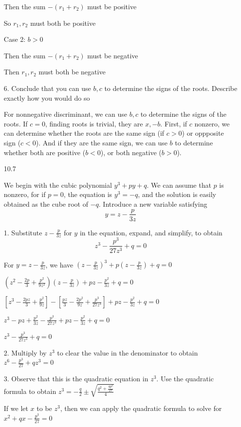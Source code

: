 \documentclass[12pt]{article}
\begin{document}
\begin{itemize}
		Then the sum $-(r_1 + r_2)$ must be positive

		So $r_1, r_2$ must both be positive

		Case 2: $b > 0$

		Then the sum $-(r_1 + r_2)$ must be negative

		Then $r_1, r_2$ must both be negative

	6. Conclude that you can use $b, c$ to determine the signs of the roots. Describe exactly how you would do so

		For nonnegative discriminant, we can use $b,c$ to determine the signs of the roots. If $c = 0$, finding roots is trivial, they are $x, -b$. First, if $c$ nonzero, we can determine whether the roots are the same sign (if $c > 0$) or oppposite sign ($c < 0$). And if they are the same sign, we can use $b$ to determine whether both are positive ($b < 0$), or both negative ($b > 0$).
		

\newpage

\item[10.7]

	We begin with the cubic polynomial $y^3 + py + q$. We can assume that $p$ is nonzero, for if $p = 0$, the equation is $y^3 = -q$, and the solution is easily obtained as the cube root of $-q$. Introduce a new variable satisfying $$y = z - \frac{p}{3z}$$

	1. Substitute $z - \frac{p}{3z}$ for $y$ in the equation, expand, and simplify, to obtain $$z^3 - \frac{p^3}{27z^3} + q = 0$$

	For $y = z - \frac{p}{3z}$, we have $(z - \frac{p}{3z})^3 + p(z-\frac{p}{3z}) + q = 0$

	$(z^2 - \frac{2p}{3} + \frac{p^2}{9z^2})(z-\frac{p}{3z}) + pz - \frac{p^2}{3z} + q = 0$

	$[z^3 - \frac{2pz}{3} + \frac{p^2}{9z}] - [\frac{pz}{3} - \frac{2p^2}{9z} + \frac{p^3}{27z^3}] + pz - \frac{p^2}{3z} + q = 0$

	$z^3 - pz + \frac{p^2}{3z} - \frac{p^3}{27z^3} + pz - \frac{p^2}{3z} + q = 0$

	$z^3 - \frac{p^3}{27z^3} + q = 0$

	2. Multiply by $z^3$ to clear the value in the denominator to obtain $z^6 - \frac{p^3}{27} + qz^3 = 0$

	3. Observe that this is the quadratic equation in $z^3$. Use the quadratic formula to obtain $z^3 = -\frac{q}{2} \pm \sqrt{\frac{q^2 + \frac{4p^3}{27}}{4}}$

	If we let $x$ to be $z^3$, then we can apply the quadratic formula to solve for $x^2 + qx - \frac{p^3}{27} = 0$


\end{itemize}
\end{document}
